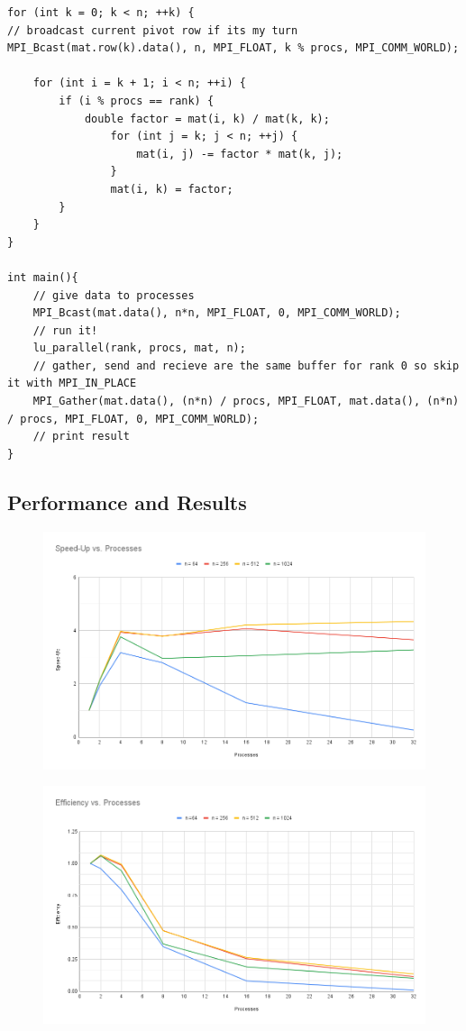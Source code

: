 \documentclass[12pt,letterpaper]{article}
\begin{document}
\begin{lstlisting}
for (int k = 0; k < n; ++k) {
// broadcast current pivot row if its my turn
MPI_Bcast(mat.row(k).data(), n, MPI_FLOAT, k % procs, MPI_COMM_WORLD);

    for (int i = k + 1; i < n; ++i) {
        if (i % procs == rank) {
            double factor = mat(i, k) / mat(k, k);
                for (int j = k; j < n; ++j) {
                    mat(i, j) -= factor * mat(k, j);
                }
                mat(i, k) = factor;
        }
    }
}

int main(){
    // give data to processes
    MPI_Bcast(mat.data(), n*n, MPI_FLOAT, 0, MPI_COMM_WORLD);
    // run it!
    lu_parallel(rank, procs, mat, n);
    // gather, send and recieve are the same buffer for rank 0 so skip it with MPI_IN_PLACE
    MPI_Gather(mat.data(), (n*n) / procs, MPI_FLOAT, mat.data(), (n*n) / procs, MPI_FLOAT, 0, MPI_COMM_WORLD);
    // print result
}
\end{lstlisting}
\subsection{Performance and Results}

\begin{figure}
    \centering
    \includegraphics[width=0.9\linewidth]{"Speed-Up vs. Processes"}
    \caption{}
    \label{fig:speed-up-mpi}
\end{figure}

\begin{figure}
    \centering
    \includegraphics[width=0.9\linewidth]{"Efficiency vs. Processes"}
    \caption{}
    \label{fig:efficiency-mpi}
\end{figure}
\end{document}
